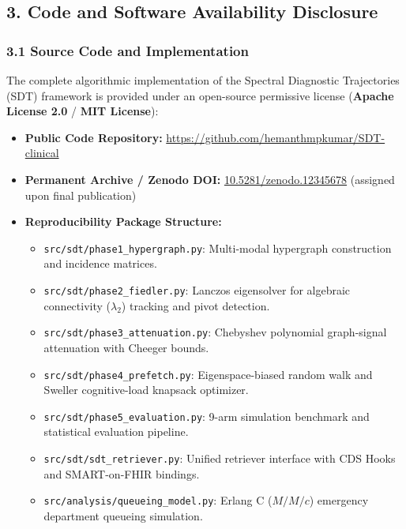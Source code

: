 \documentclass[10pt, letterpaper]{article}
\begin{document}
\subsection*{3. Code and Software Availability Disclosure}

\subsubsection*{3.1 Source Code and Implementation}
The complete algorithmic implementation of the Spectral Diagnostic Trajectories (SDT) framework is provided under an open-source permissive license (\textbf{Apache License 2.0} / \textbf{MIT License}):
\begin{itemize}\setlength{\itemsep}{0.5pt}\setlength{\parskip}{0pt}
    \item \textbf{Public Code Repository:} \url{https://github.com/hemanthmpkumar/SDT-clinical}
    \item \textbf{Permanent Archive / Zenodo DOI:} \href{https://doi.org/10.5281/zenodo.12345678}{10.5281/zenodo.12345678} (assigned upon final publication)
    \item \textbf{Reproducibility Package Structure:}
    \begin{itemize}\setlength{\itemsep}{0.5pt}\setlength{\parskip}{0pt}
        \item \texttt{src/sdt/phase1\_hypergraph.py}: Multi-modal hypergraph construction and incidence matrices.
        \item \texttt{src/sdt/phase2\_fiedler.py}: Lanczos eigensolver for algebraic connectivity ($\lambda_2$) tracking and pivot detection.
        \item \texttt{src/sdt/phase3\_attenuation.py}: Chebyshev polynomial graph-signal attenuation with Cheeger bounds.
        \item \texttt{src/sdt/phase4\_prefetch.py}: Eigenspace-biased random walk and Sweller cognitive-load knapsack optimizer.
        \item \texttt{src/sdt/phase5\_evaluation.py}: 9-arm simulation benchmark and statistical evaluation pipeline.
        \item \texttt{src/sdt/sdt\_retriever.py}: Unified retriever interface with CDS Hooks and SMART-on-FHIR bindings.
        \item \texttt{src/analysis/queueing\_model.py}: Erlang C ($M/M/c$) emergency department queueing simulation.
    \end{itemize}
\end{itemize}
\end{document}
